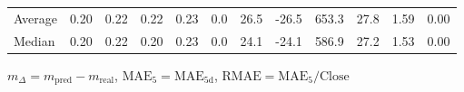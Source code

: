 \begin{threeparttable}
{\begin{tabular}{lrrrrrrrrrrr}
Average &          0.20 &          0.22 &          0.22 &        0.23 &                 0.0 &                26.5 &      -26.5 &               653.3 &             27.8 &            1.59 &                   0.00 \\
 Median &          0.20 &          0.22 &          0.20 &        0.23 &                 0.0 &                24.1 &      -24.1 &               586.9 &             27.2 &            1.53 &                   0.00 \\
\bottomrule
\end{tabular}
}
\begin{tablenotes}\footnotesize
\item $m_\Delta=m_{\text{pred}}-m_{\text{real}}$,
$\mathrm{MAE}_5=\mathrm{MAE}_{5\text{d}}$,
$\mathrm{RMAE}=\mathrm{MAE}_5/\text{Close}$
\end{tablenotes}
\end{threeparttable}
\endgroup

